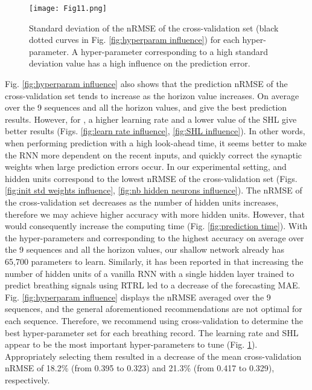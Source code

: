 \documentclass[twocolumn,a4paper]{svjour3} \sloppy          \smartqed
\begin{document}
\begin{figure}[htb!]
\centering
\texttt{[image: Fig11.png]}
\caption{Standard deviation of the nRMSE of the cross-validation set (black dotted curves in Fig. \ref{fig:hyperparam influence}) for each hyper-parameter. A hyper-parameter corresponding to a high standard deviation value has a high influence on the prediction error.} 
\label{fig:relative param influence}
\end{figure}

Fig. \ref{fig:hyperparam influence} also shows that the prediction nRMSE of the cross-validation set tends to increase as the horizon value  increases. On average over the 9 sequences and all the horizon values,  and  give the best prediction results. However, for , a higher learning rate  and a lower value of the SHL  give better results (Figs. \ref{fig:learn rate influence}, \ref{fig:SHL influence}). In other words, when performing prediction with a high look-ahead time, it seems better to make the RNN more dependent on the recent inputs, and quickly correct the synaptic weights when large prediction errors occur. In our experimental setting,  and  hidden units correspond to the lowest nRMSE of the cross-validation set (Figs. \ref{fig:init std weights influence}, \ref{fig:nb hidden neurons influence}). The nRMSE of the cross-validation set decreases as the number of hidden units increases, therefore we may achieve higher accuracy with more hidden units. However, that would consequently increase the computing time (Fig. \ref{fig:prediction time}). With the hyper-parameters  and  corresponding to the highest accuracy on average over the 9 sequences and all the horizon values, our shallow network already has 65,700 parameters to learn. Similarly, it has been reported in \cite{POHL2021101941} that increasing the number of hidden units of a vanilla RNN with a single hidden layer trained to predict breathing signals using RTRL led to a decrease of the forecasting MAE. Fig. \ref{fig:hyperparam influence} displays the nRMSE averaged over the 9 sequences, and the general aforementioned recommendations are not optimal for each sequence. Therefore, we recommend using cross-validation to determine the best hyper-parameter set for each breathing record. The learning rate and SHL appear to be the most important hyper-parameters to tune (Fig. \ref{fig:relative param influence}). Appropriately selecting them resulted in a decrease of the mean cross-validation nRMSE of 18.2\% (from 0.395 to 0.323) and 21.3\% (from 0.417 to 0.329), respectively.
\end{document}
